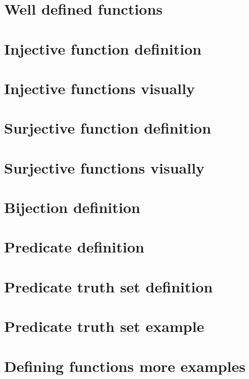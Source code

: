 
\section*{Well defined functions}

\vfill
\section*{Injective function definition}

\vfill
\section*{Injective functions visually}

\vfill
\section*{Surjective function definition}

\vfill
\section*{Surjective functions visually}

\vfill
\section*{Bijection definition}

\vfill
\section*{Predicate definition}

\vfill
\section*{Predicate truth set definition}

\vfill
\section*{Predicate truth set example}

\vfill
\section*{Defining functions more examples}

\vfill
